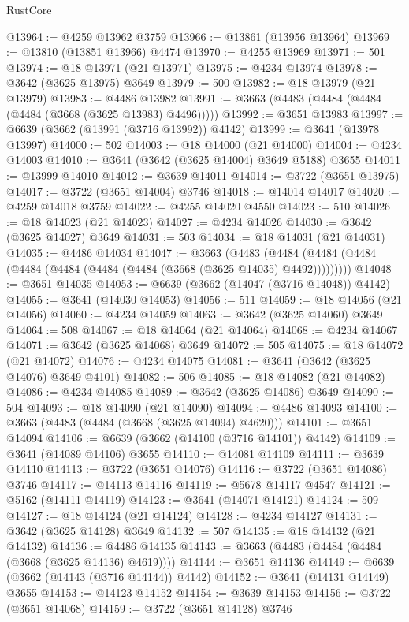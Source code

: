 \begin{lexlean}{RustCore}
\begin{coremodule}
@13964 := @4259 @13962 @3759
@13966 := @13861 (@13956 @13964)
@13969 := @13810 (@13851 @13966) @4474
@13970 := @4255 @13969
@13971 := 501
@13974 := @18 @13971 (@21 @13971)
@13975 := @4234 @13974
@13978 := @3642 (@3625 @13975) @3649
@13979 := 500
@13982 := @18 @13979 (@21 @13979)
@13983 := @4486 @13982
@13991 := @3663 (@4483 (@4484 (@4484 (@4484 (@3668 (@3625 @13983) @4496)))))
@13992 := @3651 @13983
@13997 := @6639 (@3662 (@13991 (@3716 @13992)) @4142)
@13999 := @3641 (@13978 @13997)
@14000 := 502
@14003 := @18 @14000 (@21 @14000)
@14004 := @4234 @14003
@14010 := @3641 (@3642 (@3625 @14004) @3649 @5188) @3655
@14011 := @13999 @14010
@14012 := @3639 @14011
@14014 := @3722 (@3651 @13975)
@14017 := @3722 (@3651 @14004) @3746
@14018 := @14014 @14017
@14020 := @4259 @14018 @3759
@14022 := @4255 @14020 @4550
@14023 := 510
@14026 := @18 @14023 (@21 @14023)
@14027 := @4234 @14026
@14030 := @3642 (@3625 @14027) @3649
@14031 := 503
@14034 := @18 @14031 (@21 @14031)
@14035 := @4486 @14034
@14047 := @3663
    (@4483 (@4484 (@4484 (@4484 (@4484 (@4484 (@4484 (@4484 (@3668 (@3625 @14035) @4492)))))))))
@14048 := @3651 @14035
@14053 := @6639 (@3662 (@14047 (@3716 @14048)) @4142)
@14055 := @3641 (@14030 @14053)
@14056 := 511
@14059 := @18 @14056 (@21 @14056)
@14060 := @4234 @14059
@14063 := @3642 (@3625 @14060) @3649
@14064 := 508
@14067 := @18 @14064 (@21 @14064)
@14068 := @4234 @14067
@14071 := @3642 (@3625 @14068) @3649
@14072 := 505
@14075 := @18 @14072 (@21 @14072)
@14076 := @4234 @14075
@14081 := @3641 (@3642 (@3625 @14076) @3649 @4101)
@14082 := 506
@14085 := @18 @14082 (@21 @14082)
@14086 := @4234 @14085
@14089 := @3642 (@3625 @14086) @3649
@14090 := 504
@14093 := @18 @14090 (@21 @14090)
@14094 := @4486 @14093
@14100 := @3663 (@4483 (@4484 (@3668 (@3625 @14094) @4620)))
@14101 := @3651 @14094
@14106 := @6639 (@3662 (@14100 (@3716 @14101)) @4142)
@14109 := @3641 (@14089 @14106) @3655
@14110 := @14081 @14109
@14111 := @3639 @14110
@14113 := @3722 (@3651 @14076)
@14116 := @3722 (@3651 @14086) @3746
@14117 := @14113 @14116
@14119 := @5678 @14117 @4547
@14121 := @5162 (@14111 @14119)
@14123 := @3641 (@14071 @14121)
@14124 := 509
@14127 := @18 @14124 (@21 @14124)
@14128 := @4234 @14127
@14131 := @3642 (@3625 @14128) @3649
@14132 := 507
@14135 := @18 @14132 (@21 @14132)
@14136 := @4486 @14135
@14143 := @3663 (@4483 (@4484 (@4484 (@3668 (@3625 @14136) @4619))))
@14144 := @3651 @14136
@14149 := @6639 (@3662 (@14143 (@3716 @14144)) @4142)
@14152 := @3641 (@14131 @14149) @3655
@14153 := @14123 @14152
@14154 := @3639 @14153
@14156 := @3722 (@3651 @14068)
@14159 := @3722 (@3651 @14128) @3746

\end{coremodule}
\end{lexlean}
